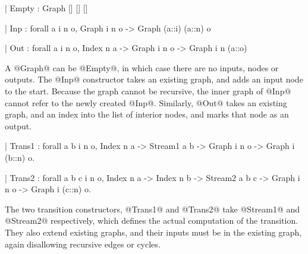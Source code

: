 \begin{code}
 | Empty  : Graph [] [] []

 | Inp    : forall a i n o,
            Graph i n o
         -> Graph (a::i) (a::n) o

 | Out    : forall a i n o,
            Index n a
         -> Graph i n o
         -> Graph i n (a::o)
\end{code}

A @Graph@ can be @Empty@, in which case there are no inputs, nodes or outputs.
The @Inp@ constructor takes an existing graph, and adds an input node to the start.
Because the graph cannot be recursive, the inner graph of @Inp@ cannot refer to the newly created @Inp@.
Similarly, @Out@ takes an existing graph, and an index into the list of interior nodes, and marks that node as an output.

\begin{code}
 | Trans1 : forall a b i n o,
            Index n a
         -> Stream1 a b
         -> Graph i n o
         -> Graph i (b::n) o.

 | Trans2 : forall a b c i n o,
            Index n a
         -> Index n b
         -> Stream2 a b c
         -> Graph i n o
         -> Graph i (c::n) o.
\end{code}
The two transition constructors, @Trans1@ and @Trans2@ take @Stream1@ and @Stream2@ respectively, which defines the actual computation of the transition. They also extend existing graphs, and their inputs must be in the existing graph, again disallowing recursive edges or cycles.


